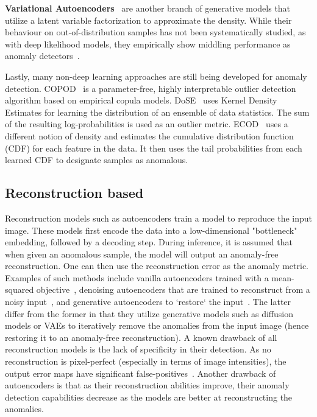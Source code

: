 \textbf{Variational Autoencoders}~\cite{kingma2013auto} are another branch of generative models that utilize a latent variable factorization to approximate the density. While their behaviour on out-of-distribution samples has not been systematically studied, as with deep likelihood models, they empirically show middling performance as anomaly detectors~\cite{baur2021,kascenasRoleNoiseDenoising2023}.

Lastly, many non-deep learning approaches are still being developed for anomaly detection. COPOD~\cite{copod} is a parameter-free, highly interpretable outlier detection algorithm based on empirical copula models. DoSE~\cite{pmlr-dose} uses Kernel Density Estimates for learning the distribution of an ensemble of data statistics. The sum of the resulting log-probabilities is used as an outlier metric. ECOD~\cite{li_ecod_2022} uses a different notion of density and estimates the cumulative distribution function (CDF) for each feature in the data. It then uses the tail probabilities from each learned CDF to designate samples as anomalous.

\subsection{Reconstruction based}

Reconstruction models such as autoencoders train a model to reproduce the input image. These models first encode the data into a low-dimensional "bottleneck" embedding, followed by a decoding step. During inference, it is assumed that when given an anomalous sample, the model will output an anomaly-free reconstruction. One can then use the reconstruction error as the anomaly metric. Examples of such methods include vanilla autoencoders trained with a mean-squared objective~\cite{aelu2023}, denoising autoencoders that are trained to reconstruct from a noisy input~\cite{dae-kascenas22a}, and generative autoencoders to `restore` the input~\cite{grahamDenoisingDiffusionModels2023,wyattAnoddpmAnomalyDetection2022}. The latter differ from the former in that they utilize generative models such as diffusion models or VAEs to iteratively remove the anomalies from the input image (hence restoring it to an anomaly-free reconstruction).
A known drawback of all reconstruction models is the lack of specificity in their detection. As no reconstruction is pixel-perfect (especially in terms of image intensities), the output error maps have significant false-positives~\cite{baur2021}. Another drawback of autoencoders is that as their reconstruction abilities improve, their anomaly detection capabilities decrease as the models are better at reconstructing the anomalies.

